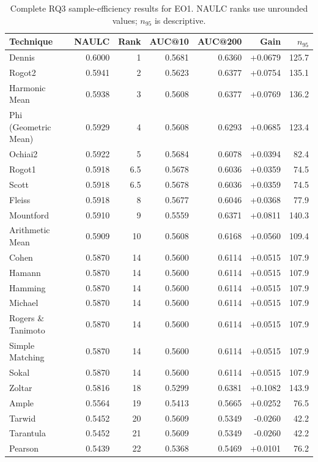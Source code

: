 \begin{table}[t]
\centering
\caption{Complete RQ3 sample-efficiency results for EO1. NAULC ranks use unrounded values; $n_{95}$ is descriptive.}
\label{tab:rq3v2-efficiency-eo1}
{\scriptsize
\setlength{\tabcolsep}{6pt}
\begin{tabular}{lrrrrrr}
\toprule
Technique & NAULC & Rank & AUC@10 & AUC@200 & Gain & $n_{95}$ \\
\midrule
Dennis & 0.6000 & 1 & 0.5681 & 0.6360 & +0.0679 & 125.7 \\
Rogot2 & 0.5941 & 2 & 0.5623 & 0.6377 & +0.0754 & 135.1 \\
Harmonic Mean & 0.5938 & 3 & 0.5608 & 0.6377 & +0.0769 & 136.2 \\
Phi (Geometric Mean) & 0.5929 & 4 & 0.5608 & 0.6293 & +0.0685 & 123.4 \\
Ochiai2 & 0.5922 & 5 & 0.5684 & 0.6078 & +0.0394 & 82.4 \\
Rogot1 & 0.5918 & 6.5 & 0.5678 & 0.6036 & +0.0359 & 74.5 \\
Scott & 0.5918 & 6.5 & 0.5678 & 0.6036 & +0.0359 & 74.5 \\
Fleiss & 0.5918 & 8 & 0.5677 & 0.6046 & +0.0368 & 77.9 \\
Mountford & 0.5910 & 9 & 0.5559 & 0.6371 & +0.0811 & 140.3 \\
Arithmetic Mean & 0.5909 & 10 & 0.5608 & 0.6168 & +0.0560 & 109.4 \\
Cohen & 0.5870 & 14 & 0.5600 & 0.6114 & +0.0515 & 107.9 \\
Hamann & 0.5870 & 14 & 0.5600 & 0.6114 & +0.0515 & 107.9 \\
Hamming & 0.5870 & 14 & 0.5600 & 0.6114 & +0.0515 & 107.9 \\
Michael & 0.5870 & 14 & 0.5600 & 0.6114 & +0.0515 & 107.9 \\
Rogers \& Tanimoto & 0.5870 & 14 & 0.5600 & 0.6114 & +0.0515 & 107.9 \\
Simple Matching & 0.5870 & 14 & 0.5600 & 0.6114 & +0.0515 & 107.9 \\
Sokal & 0.5870 & 14 & 0.5600 & 0.6114 & +0.0515 & 107.9 \\
Zoltar & 0.5816 & 18 & 0.5299 & 0.6381 & +0.1082 & 143.9 \\
Ample & 0.5564 & 19 & 0.5413 & 0.5665 & +0.0252 & 76.5 \\
Tarwid & 0.5452 & 20 & 0.5609 & 0.5349 & -0.0260 & 42.2 \\
Tarantula & 0.5452 & 21 & 0.5609 & 0.5349 & -0.0260 & 42.2 \\
Pearson & 0.5439 & 22 & 0.5368 & 0.5469 & +0.0101 & 76.2 \\

\end{tabular}}
\end{table}
